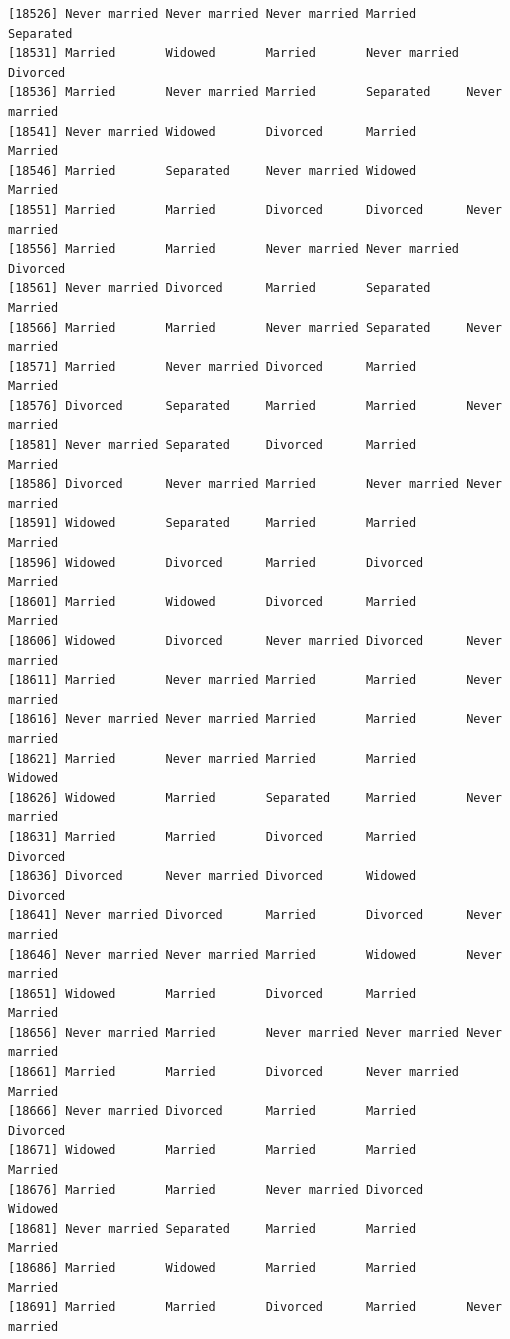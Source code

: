\documentclass[
  letterpaper,
  DIV=11,
  numbers=noendperiod,
  oneside]{scrartcl}
\begin{document}
\begin{verbatim}
[18526] Never married Never married Never married Married       Separated    
[18531] Married       Widowed       Married       Never married Divorced     
[18536] Married       Never married Married       Separated     Never married
[18541] Never married Widowed       Divorced      Married       Married      
[18546] Married       Separated     Never married Widowed       Married      
[18551] Married       Married       Divorced      Divorced      Never married
[18556] Married       Married       Never married Never married Divorced     
[18561] Never married Divorced      Married       Separated     Married      
[18566] Married       Married       Never married Separated     Never married
[18571] Married       Never married Divorced      Married       Married      
[18576] Divorced      Separated     Married       Married       Never married
[18581] Never married Separated     Divorced      Married       Married      
[18586] Divorced      Never married Married       Never married Never married
[18591] Widowed       Separated     Married       Married       Married      
[18596] Widowed       Divorced      Married       Divorced      Married      
[18601] Married       Widowed       Divorced      Married       Married      
[18606] Widowed       Divorced      Never married Divorced      Never married
[18611] Married       Never married Married       Married       Never married
[18616] Never married Never married Married       Married       Never married
[18621] Married       Never married Married       Married       Widowed      
[18626] Widowed       Married       Separated     Married       Never married
[18631] Married       Married       Divorced      Married       Divorced     
[18636] Divorced      Never married Divorced      Widowed       Divorced     
[18641] Never married Divorced      Married       Divorced      Never married
[18646] Never married Never married Married       Widowed       Never married
[18651] Widowed       Married       Divorced      Married       Married      
[18656] Never married Married       Never married Never married Never married
[18661] Married       Married       Divorced      Never married Married      
[18666] Never married Divorced      Married       Married       Divorced     
[18671] Widowed       Married       Married       Married       Married      
[18676] Married       Married       Never married Divorced      Widowed      
[18681] Never married Separated     Married       Married       Married      
[18686] Married       Widowed       Married       Married       Married      
[18691] Married       Married       Divorced      Married       Never married

\end{verbatim}
\end{document}
